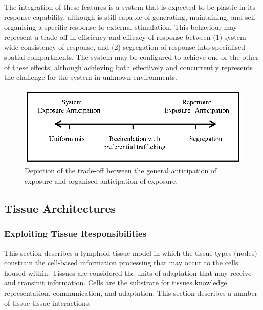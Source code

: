 The integration of these features is a system that is expected to be plastic in its response capability, although is still capable of generating, maintaining, and self-organising a specific response to external stimulation. This behaviour may represent a trade-off in efficiency and efficacy of response between (1) system-wide consistency of response, and (2) segregation of response into specialised spatial compartments. The system may be configured to achieve one or the other of these effects, although achieving both effectively and concurrently represents the challenge for the system in unknown environments.

\begin{figure}[ht]
	\centering
	\includegraphics[scale=0.75]{Tissues/tissues-effects-integration}
	\caption{Depiction of the trade-off between the general anticipation of exposure and organised anticipation of exposure.}
	\label{fig:tissues:effects:integration}
\end{figure}


%
%
\subsection{Tissue Architectures}
\label{subsec:tissues:paradigm:architectures}
%
%
\subsubsection{Exploiting Tissue Responsibilities}
This section describes a lymphoid tissue model in which the tissue types (nodes) constrain the cell-based information processing that may occur to the cells housed within. Tissues are considered the units of adaptation that may receive and transmit information. Cells are the substrate for tissues knowledge representation, communication, and adaptation. This section describes a number of tissue-tissue interactions. 

%
%
